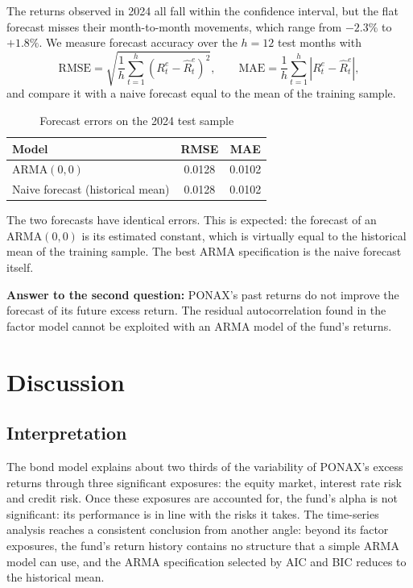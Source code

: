 \documentclass[11pt,a4paper]{article}
\begin{document}
The returns observed in 2024 all fall within the confidence interval, but the flat forecast misses their month-to-month movements, which range from $-2.3\%$ to $+1.8\%$. We measure forecast accuracy over the $h = 12$ test months with
\begin{equation}
\text{RMSE} = \sqrt{\frac{1}{h}\sum_{t=1}^{h}\left(R^e_t - \hat{R}^e_t\right)^2},
\qquad
\text{MAE} = \frac{1}{h}\sum_{t=1}^{h}\left|R^e_t - \hat{R}^e_t\right|,
\end{equation}
and compare it with a naive forecast equal to the mean of the training sample.

\begin{table}[H]
\centering
\caption{Forecast errors on the 2024 test sample}
\small
\begin{tabular}{lcc}
\toprule
Model & RMSE & MAE \\
\midrule
ARMA$(0,0)$ & 0.0128 & 0.0102 \\
Naive forecast (historical mean) & 0.0128 & 0.0102 \\
\bottomrule
\end{tabular}
\end{table}

The two forecasts have identical errors. This is expected: the forecast of an ARMA$(0,0)$ is its estimated constant, which is virtually equal to the historical mean of the training sample. The best ARMA specification is the naive forecast itself.

\textbf{Answer to the second question:} PONAX's past returns do not improve the forecast of its future excess return. The residual autocorrelation found in the factor model cannot be exploited with an ARMA model of the fund's returns.

\section{Discussion}

\subsection{Interpretation}

The bond model explains about two thirds of the variability of PONAX's excess returns through three significant exposures: the equity market, interest rate risk and credit risk. Once these exposures are accounted for, the fund's alpha is not significant: its performance is in line with the risks it takes. The time-series analysis reaches a consistent conclusion from another angle: beyond its factor exposures, the fund's return history contains no structure that a simple ARMA model can use, and the ARMA specification selected by AIC and BIC reduces to the historical mean.
\end{document}
